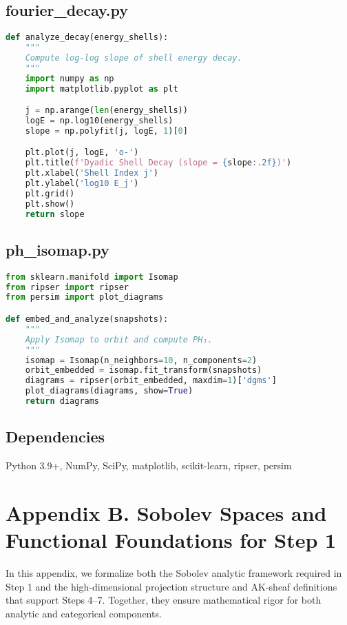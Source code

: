 \documentclass[11pt]{article}
\theoremstyle{definition}
\begin{document}
\subsection*{fourier\_decay.py}
\begin{lstlisting}[language=Python]
def analyze_decay(energy_shells):
    """
    Compute log-log slope of shell energy decay.
    """
    import numpy as np
    import matplotlib.pyplot as plt

    j = np.arange(len(energy_shells))
    logE = np.log10(energy_shells)
    slope = np.polyfit(j, logE, 1)[0]

    plt.plot(j, logE, 'o-')
    plt.title(f'Dyadic Shell Decay (slope = {slope:.2f})')
    plt.xlabel('Shell Index j')
    plt.ylabel('log10 E_j')
    plt.grid()
    plt.show()
    return slope
\end{lstlisting}

\subsection*{ph\_isomap.py}
\begin{lstlisting}[language=Python]
from sklearn.manifold import Isomap
from ripser import ripser
from persim import plot_diagrams

def embed_and_analyze(snapshots):
    """
    Apply Isomap to orbit and compute PH₁.
    """
    isomap = Isomap(n_neighbors=10, n_components=2)
    orbit_embedded = isomap.fit_transform(snapshots)
    diagrams = ripser(orbit_embedded, maxdim=1)['dgms']
    plot_diagrams(diagrams, show=True)
    return diagrams
\end{lstlisting}

\subsection*{Dependencies}
Python 3.9+, NumPy, SciPy, matplotlib, scikit-learn, ripser, persim


\section*{Appendix B. Sobolev Spaces and Functional Foundations for Step 1}

In this appendix, we formalize both the Sobolev analytic framework required in Step 1 and the high-dimensional projection structure and AK-sheaf definitions that support Steps 4--7. Together, they ensure mathematical rigor for both analytic and categorical components.
\end{document}
